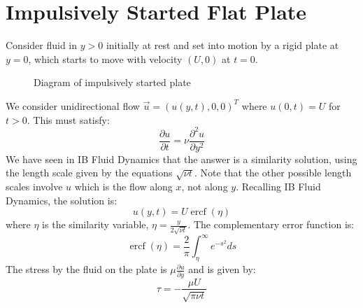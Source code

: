 \documentclass[../Main.tex]{subfiles}
\begin{document}
\section{Impulsively Started Flat Plate}
\label{secImpulsePlate}
Consider fluid in $y > 0$ initially at rest and set into motion by a rigid plate at $y = 0$, which starts to move with velocity $(U, 0)$ at $t = 0$.
\begin{figure}
    \centering
    \caption{Diagram of impulsively started plate}
    \label{figImpulsePlate}
\end{figure}
We consider unidirectional flow $\vec{u} = (u(y, t), 0, 0)^T$ where $u(0, t) = U$ for $t > 0$. This must satisfy:
\begin{equation*}
    \frac{\partial u}{\partial t} = \nu \frac{\partial^{2}u}{\partial y^{2}}
\end{equation*}
We have seen in IB Fluid Dynamics that the answer is a similarity solution, using the length scale given by the equations $\sqrt{\nu t}$. Note that the other possible length scales involve $u$ which is the flow along $x$, not along $y$. Recalling IB Fluid Dynamics, the solution is:
\begin{equation*}
    u(y, t) = U \operatorname{ercf}(\eta)
\end{equation*}
where $\eta$ is the similarity variable, $\eta = \frac{y}{2\sqrt{\nu t}}$. The complementary error function is:
\begin{equation*}
    \operatorname{ercf}(\eta) = \frac{2}{\pi} \int_{\eta}^{\infty} e^{-s^2} ds 
\end{equation*}
The stress by the fluid on the plate is $\mu \frac{\partial u}{\partial y}$ and is given by:
\begin{equation*}
    \tau = -\frac{\mu U}{\sqrt{\pi \nu t}}
\end{equation*}
\end{document}
